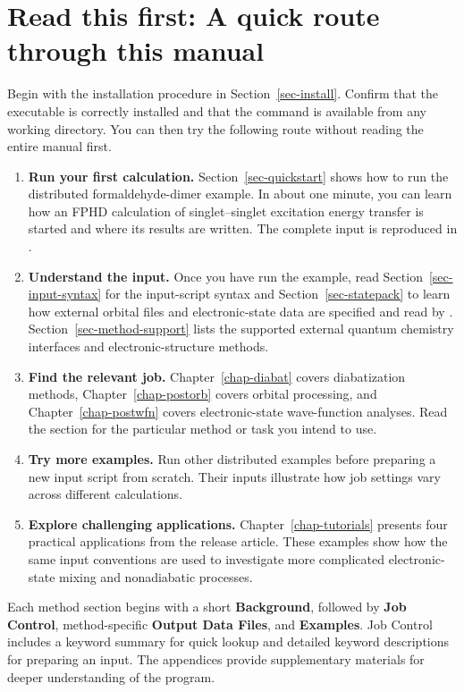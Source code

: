 \section{Read this first: A quick route through this manual}\label{sec-manual-route}
Begin with the installation procedure in Section~\ref{sec-install}. Confirm that the executable is correctly installed and that the \exec{} command is available from any working directory. You can then try the following route without reading the entire manual first.

\begin{enumerate}
\item \textbf{Run your first calculation.} Section~\ref{sec-quickstart} shows how to run the distributed formaldehyde-dimer example. In about one minute, you can learn how an FPHD calculation of singlet--singlet excitation energy transfer is started and where its results are written. The complete input is reproduced in .

\item \textbf{Understand the input.} Once you have run the example, read Section~\ref{sec-input-syntax} for the input-script syntax and Section~\ref{sec-statepack} to learn how external orbital files and electronic-state data are specified and read by \progname{}.
Section~\ref{sec-method-support} lists the supported external quantum chemistry interfaces and electronic-structure methods.

\item \textbf{Find the relevant job.} Chapter~\ref{chap-diabat} covers diabatization methods, Chapter~\ref{chap-postorb} covers orbital processing, and Chapter~\ref{chap-postwfn} covers electronic-state wave-function analyses. Read the section for the particular method or task you intend to use.

\item \textbf{Try more examples.} Run other distributed examples before preparing a new input script from scratch.
Their inputs illustrate how job settings vary across different calculations.

\item \textbf{Explore challenging applications.} Chapter~\ref{chap-tutorials} presents four practical applications from the release article. These examples show how the same input conventions are used to investigate more complicated electronic-state mixing and nonadiabatic processes.
\end{enumerate}

Each method section begins with a short \textbf{Background}, followed by \textbf{Job Control}, method-specific \textbf{Output Data Files}, and \textbf{Examples}. Job Control includes a keyword summary for quick lookup and detailed keyword descriptions for preparing an input. The appendices provide supplementary materials for deeper understanding of the \progname{} program.
